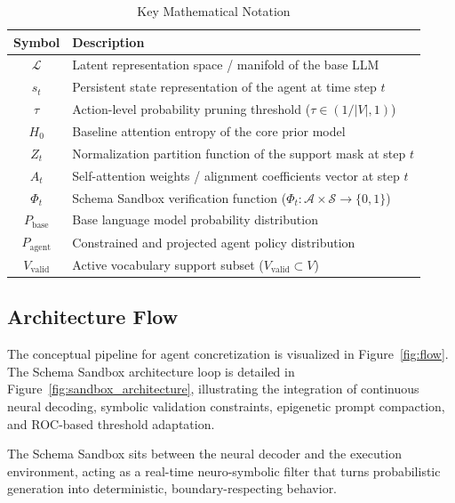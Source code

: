 \documentclass[10pt,journal,compsoc]{IEEEtran}
\begin{document}
\begin{table}[t]
\centering
\caption{Key Mathematical Notation}
\label{tab:notation}
\begin{tabular}{cp{5.5cm}}
\toprule
\textbf{Symbol} & \textbf{Description} \\
\midrule
$\mathcal{L}$ & Latent representation space / manifold of the base LLM \\
$s_t$ & Persistent state representation of the agent at time step $t$ \\
$\tau$ & Action-level probability pruning threshold ($\tau \in (1/|V|, 1)$) \\
$H_0$ & Baseline attention entropy of the core prior model \\
$Z_t$ & Normalization partition function of the support mask at step $t$ \\
$A_t$ & Self-attention weights / alignment coefficients vector at step $t$ \\
$\Phi_t$ & Schema Sandbox verification function ($\Phi_t: \mathcal{A} \times \mathcal{S} \to \{0, 1\}$) \\
$P_{\text{base}}$ & Base language model probability distribution \\
$P_{\text{agent}}$ & Constrained and projected agent policy distribution \\
$V_{\text{valid}}$ & Active vocabulary support subset ($V_{\text{valid}} \subset V$) \\
\bottomrule
\end{tabular}
\end{table}


\subsection{Architecture Flow}
The conceptual pipeline for agent concretization is visualized in Figure~\ref{fig:flow}. The Schema Sandbox architecture loop is detailed in Figure~\ref{fig:sandbox_architecture}, illustrating the integration of continuous neural decoding, symbolic validation constraints, epigenetic prompt compaction, and ROC-based threshold adaptation.

The Schema Sandbox sits between the neural decoder and the execution environment, acting as a real-time neuro-symbolic filter that turns probabilistic generation into deterministic, boundary-respecting behavior.
\end{document}
